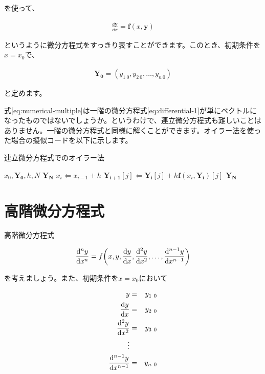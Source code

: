 \noindent
を使って、

\begin{eqnarray}
    \frac{\dd\boldsymbol{y}}{\dd x}=\boldsymbol{f}(x,\boldsymbol{y})
    \label{eq:numerical-multiple}
\end{eqnarray}

\noindent
というように微分方程式をすっきり表すことができます。このとき、初期条件を$x=x_0$で、

\begin{eqnarray}
    \boldsymbol{Y_0}=(y_{1\ 0},y_{2\ 0},\dots,y_{n\ 0})
\end{eqnarray}

\noindent
と定めます。

式\ref{eq:numerical-multiple}は一階の微分方程式\ref{eq:differential-1}が単にベクトルになったものではないでしょうか。というわけで、連立微分方程式も難しいことはありません。一階の微分方程式と同様に解くことができます。オイラー法を使った場合の擬似コードを以下に示します。

\begin{algorithm}
\label{al:multiple}
\caption{連立微分方程式でのオイラー法}
\begin{algorithmic}
\REQUIRE $x_0,\boldsymbol{Y_0},h,N$
\ENSURE $\boldsymbol{Y_N}$
    \STATE $x_i\Leftarrow x_{i-1}+h$
        \STATE $\boldsymbol{Y_{i+1}}[j]\Leftarrow \boldsymbol{Y_i}[j]+h\boldsymbol{f}(x_i,\boldsymbol{Y_i})[j]$
    \ENDFOR
\ENDFOR
\RETURN $\boldsymbol{Y_N}$
\end{algorithmic}
\end{algorithm}








\section{高階微分方程式}
\label{higher}
高階微分方程式

\begin{eqnarray}
    \frac{\dd^ny}{\dd x^n}=f\pqty{x,y,\frac{\dd y}{\dd x},\frac{\dd^2 y}{\dd x^2},\dots,\frac{\dd^{n-1} y}{\dd x^{n-1}}}
\end{eqnarray}

\noindent
を考えましょう。また、初期条件を$x=x_0$において

\begin{eqnarray}
    y&=&y_{1\ 0} \nonumber \\
    \frac{\dd y}{\dd x}&=&y_{2\ 0} \nonumber \\
    \frac{\dd^2 y}{\dd x^2}&=&y_{3\ 0} \nonumber \\
    \vdots \nonumber \\
    \frac{\dd^{n-1} y}{\dd x^{n-1}}&=&y_{n\ 0} \setcounter{equation}{34}
\end{eqnarray}

